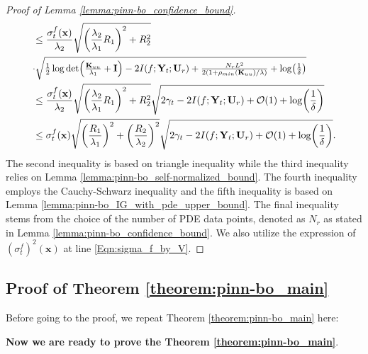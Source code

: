 \begin{proof}[Proof of Lemma \ref{lemma:pinn-bo_confidence_bound}]
\begin{align*}
                 & \le \frac{\sigma_t^f(\mathbf{x})}{\lambda_2} \sqrt{\left(\frac{\lambda_2}{\lambda_1}R_1\right)^2 + R_2^2} \notag \\
                 & \resizebox{0.8\textwidth}{!}{$\cdot \sqrt{\frac{1}{2}\log\det (\frac{\mathbf{K}_{uu}}{\lambda_1} + \mathbf{I}) - 2 I(f; \mathbf{Y}_t; \mathbf{U}_r) + \frac{N_r L^2}{2(1+ \rho_{min}(\mathbf{K}_{uu})/\lambda)} + \log(\frac{1}{\delta})}$}
                 \\
                 & \le \frac{\sigma_t^f(\mathbf{x})}{\lambda_2} \sqrt{\left(\frac{\lambda_2}{\lambda_1}R_1\right)^2 + R_2^2} \sqrt{2\gamma_t - 2 I(f; \mathbf{Y}_t; \mathbf{U}_r) + \mathcal{O}(1) + \log(\frac{1}{\delta})} 
                 \\
                 & \le \sigma_t^f(\mathbf{x}) \sqrt{\left(\frac{R_1}{\lambda_1}\right)^2 + \left(\frac{R_2}{\lambda_2}\right)^2} \sqrt{2\gamma_t - 2 I(f; \mathbf{Y}_t; \mathbf{U}_r) + \mathcal{O}(1) + \log(\frac{1}{\delta})}.
    \end{align*}
The second inequality is based on triangle inequality while the third inequality relies on Lemma \ref{lemma:pinn-bo_self-normalized_bound}. The fourth inequality employs the Cauchy-Schwarz inequality and the fifth inequality is based on Lemma \ref{lemma:pinn-bo_IG_with_pde_upper_bound}. The final inequality stems from the choice of the number of PDE data points, denoted as $N_r$ as stated in Lemma \ref{lemma:pinn-bo_confidence_bound}. We also utilize the expression of $\left(\sigma_t^f\right)^2(\mathbf{x})$ at line \eqref{Eqn:sigma_f_by_V}.
\end{proof}

\subsection{Proof of Theorem \ref{theorem:pinn-bo_main}}
Before going to the proof, we repeat Theorem \ref{theorem:pinn-bo_main} here:
\PINNBORegretBound*



\noindent \textbf{Now we are ready to prove the Theorem \ref{theorem:pinn-bo_main}}.

